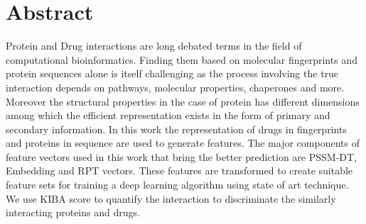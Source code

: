 

\chapter*{Abstract}
\doublespacing
Protein and Drug interactions are long debated terms in the field of computational bioinformatics. Finding them based on molecular fingerprints and protein sequences alone is itself challenging as the process involving the true interaction depends on pathways, molecular properties, chaperones and more. Moreover the structural properties in the case of protein has different dimensions among which the efficient representation exists in the form of primary and secondary information. In this work the representation of drugs in fingerprints and proteins in sequence are used to generate features. The major components of feature vectors used in this work that bring the better prediction are PSSM-DT, Embedding and RPT vectors. These features are transformed to create suitable feature sets for training a deep learning algorithm using state of art technique. We use KIBA score to quantify the interaction to discriminate the similarly interacting proteins and drugs.